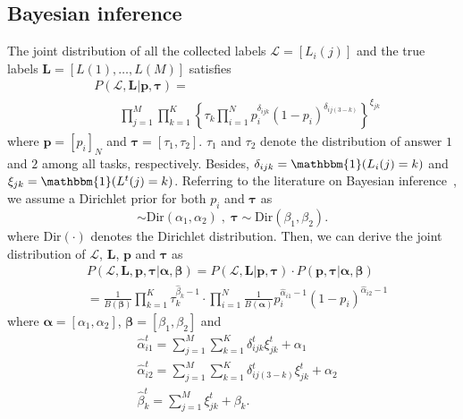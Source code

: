 \documentclass{article}
\begin{document}
\subsection{Bayesian inference}
The joint distribution of all the collected labels $\mathcal{L}=[L_i(j)]$ and the true labels $\bm{L}=[L(1),\ldots, L(M)]$ satisfies 
\begin{equation}
\begin{split}
    &P(\mathcal{L},\bm{L}| \bm{p}, \bm{\tau})=\\ &\qquad \prod_{j=1}^{M}\prod_{k=1}^{K}\left\{\tau_{k}\prod_{i=1}^{N}p_i^{\delta_{ijk}}(1-p_i)^{\delta_{ij(3-k)}} \right\}^{\xi_{jk}}
\end{split}
\end{equation}
where $\bm{p}=[p_i]_N$ and $\bm{\tau}=[\tau_1,\tau_2]$. $\tau_1$ and $\tau_2$ denote the distribution of answer $1$ and $2$ among all tasks, respectively.
Besides,  $\delta_{ijk}=\mathbbm{1}(L_i(j)=k)$ and $\xi_{jk}= \mathbbm{1}(L^{t}(j)=k)$.
Referring to the literature on Bayesian inference~\cite{liu2012variational}, we assume a Dirichlet prior for both $p_i$ and $\bm{\tau}$ as
\begin{equation}
[p_{i}, 1-p_i]\sim \textrm{Dir}(\alpha_{1},\alpha_{2})\;,\; \bm{\tau}\sim \textrm{Dir}(\beta_{1},\beta_{2}).
\end{equation}
where $\textrm{Dir}(\cdot)$ denotes the Dirichlet distribution. Then, we can derive the joint distribution of $\mathcal{L}$, $\bm{L}$, $\bm{p}$ and $\bm{\tau}$ as
\begin{equation}
\label{JointDist2}
\begin{split}
&P(\mathcal{L},\bm{L},\bm{p}, \bm{\tau}|\bm{\alpha}, \bm{\beta})=P(\mathcal{L},\bm{L}|\bm{p}, \bm{\tau})\cdot P(\bm{p}, \bm{\tau}|\bm{\alpha}, \bm{\beta})\\
&=\frac{1}{B(\bm{\beta})}\prod_{k=1}^{K}\tau_k^{\hat{\beta}_k-1}\cdot\prod_{i=1}^{N}\frac{1}{B(\bm{\alpha})}p_i^{\hat{\alpha}_{i1}-1}(1-p_i)^{\hat{\alpha}_{i2}-1}
\end{split}
\end{equation}
where $\bm{\alpha}=[\alpha_1,\alpha_2]$, $\bm{\beta}=[\beta_1,\beta_2]$ and
\begin{equation}
\begin{split}
&\hat{\alpha}^{t}_{i1}={\sum}_{j=1}^{M}{\sum}_{k=1}^{K}\delta^{t}_{ijk}\xi^{t}_{jk}+\alpha_{1}\\
&\hat{\alpha}^{t}_{i2}={\sum}_{j=1}^{M}{\sum}_{k=1}^{K}\delta^{t}_{ij(3-k)}\xi^{t}_{jk}+\alpha_{2}\\
&\hat{\beta}^{t}_k={\sum}_{j=1}^{M}\xi^{t}_{jk}+\beta_{k}.
\end{split}
\end{equation}
\end{document}
